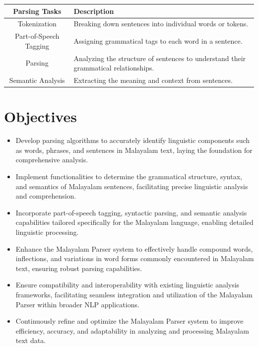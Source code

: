 \documentclass[12pt,a4paper,titlepage]{report}
\begin{document}
	
	
	
	\begin{center}
		\begin{tabular}{|c|p{12cm}|}
			\hline
			\textbf{Parsing Tasks} & \textbf{Description} \\
			\hline
			Tokenization & Breaking down sentences into individual words or tokens. \\
			\hline
			Part-of-Speech Tagging & Assigning grammatical tags to each word in a sentence. \\
			\hline
			Parsing & Analyzing the structure of sentences to understand their grammatical relationships. \\
			\hline
			Semantic Analysis & Extracting the meaning and context from sentences. \\
			\hline
		\end{tabular}
		\label{tab:parsing_tasks}
	\end{center}
	
	
	\section{Objectives}
	
	\begin{itemize}
		\item Develop parsing algorithms to accurately identify linguistic
		components such as words, phrases, and sentences in Malayalam
		text, laying the foundation for comprehensive analysis.
		\item Implement functionalities to determine the grammatical structure,
		syntax, and semantics of Malayalam sentences, facilitating precise
		linguistic analysis and comprehension.
		\item Incorporate part-of-speech tagging, syntactic parsing, and
		semantic analysis capabilities tailored specifically for the
		Malayalam language, enabling detailed linguistic processing.
		\item Enhance the Malayalam Parser system to effectively handle
		compound words, inflections, and variations in word forms
		commonly encountered in Malayalam text, ensuring robust parsing
		capabilities.
		\item Ensure compatibility and interoperability with existing linguistic
		analysis frameworks, facilitating seamless integration and
		utilization of the Malayalam Parser within broader NLP
		applications.
		\item Continuously refine and optimize the Malayalam Parser system to
		improve efficiency, accuracy, and adaptability in analyzing and
		processing Malayalam text data.
	\end{itemize}
	
\end{document}
